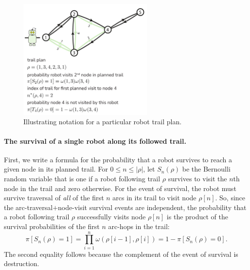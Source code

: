 \documentclass[11pt, oneside]{article}
\begin{document}
\begin{figure}[h!]
    \centering
    	\includegraphics[width=0.6\textwidth]{drawings/notation_fig/notation.pdf}
    \caption{Illustrating notation for a particular robot trail plan.} \label{fig:notation}
\end{figure}

\paragraph{The survival of a single robot along its followed trail.} First, we write a formula for the probability that a robot survives to reach a given node in its planned trail.
For $0 \leq n \leq \lvert \rho \rvert$, 
let $S_n(\rho)$ be the Bernoulli random variable that is one if a robot following trail $\rho$ survives to visit the $n$th node in the trail and zero otherwise. For the event of survival, the robot must survive traversal of \emph{all} of the first $n$ arcs in its trail to visit node $\rho[n]$. So, since the arc-traversal$+$node-visit survival events are independent, the probability that a robot following trail $\rho$ successfully visits node $\rho[n]$ is the product of the survival probabilities of the first $n$ arc-hops in the trail:
\begin{equation}
	\pi[S_n(\rho) = 1] = \prod_{i=1}^n \omega(\rho[i-1], \rho[i]) 
	= 1 - \pi[S_n(\rho) = 0]. \label{eq:pi_S_n}
\end{equation} %
The second equality follows because the complement of the event of survival is destruction.

\end{document}
